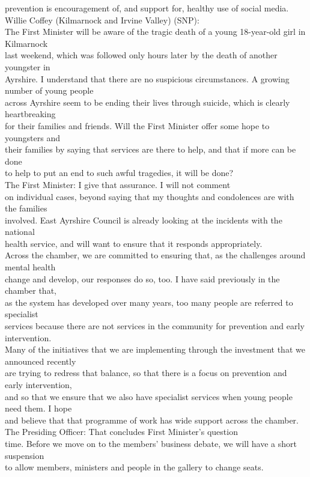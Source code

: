 \documentclass{article}
\begin{document}
\begin{description}
{prevention is encouragement of, and support for, healthy use of social media.\\
Willie Coffey (Kilmarnock and Irvine Valley) (SNP):\\
The First Minister will be aware of the tragic death of a young 18-year-old girl in Kilmarnock\\
last weekend, which was followed only hours later by the death of another youngster in\\
Ayrshire. I understand that there are no suspicious circumstances. A growing number of young people\\
across Ayrshire seem to be ending their lives through suicide, which is clearly heartbreaking\\
for their families and friends. Will the First Minister offer some hope to youngsters and\\
their families by saying that services are there to help, and that if more can be done\\
to help to put an end to such awful tragedies, it will be done?\\
The First Minister: I give that assurance. I will not comment\\
on individual cases, beyond saying that my thoughts and condolences are with the families\\
involved. East Ayrshire Council is already looking at the incidents with the national\\
health service, and will want to ensure that it responds appropriately.\\
Across the chamber, we are committed to ensuring that, as the challenges around mental health\\
change and develop, our responses do so, too. I have said previously in the chamber that,\\
as the system has developed over many years, too many people are referred to specialist\\
services because there are not services in the community for prevention and early intervention.\\
Many of the initiatives that we are implementing through the investment that we announced recently\\
are trying to redress that balance, so that there is a focus on prevention and early intervention,\\
and so that we ensure that we also have specialist services when young people need them. I hope\\
and believe that that programme of work has wide support across the chamber.\\
The Presiding Officer: That concludes First Minister’s question\\
time. Before we move on to the members’ business debate, we will have a short suspension\\
to allow members, ministers and people in the gallery to change seats.}


\end{description}
\end{document}
